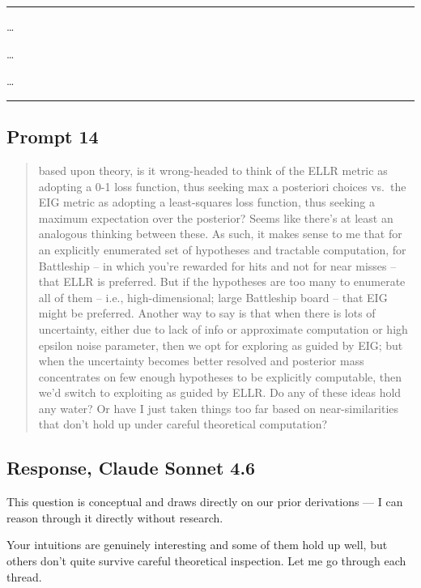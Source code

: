 \documentclass[
]{article}
\begin{document}
\begin{center}\rule{0.5\linewidth}{0.5pt}\end{center}

\ldots{}

\ldots{}

\ldots{}

\begin{center}\rule{0.5\linewidth}{0.5pt}\end{center}

\subsection{Prompt 14}\label{prompt-14}

\begin{quote}
based upon theory, is it wrong-headed to think of the ELLR metric as
adopting a 0-1 loss function, thus seeking max a posteriori choices
vs.~the EIG metric as adopting a least-squares loss function, thus
seeking a maximum expectation over the posterior? Seems like there's at
least an analogous thinking between these. As such, it makes sense to me
that for an explicitly enumerated set of hypotheses and tractable
computation, for Battleship -- in which you're rewarded for hits and not
for near misses -- that ELLR is preferred. But if the hypotheses are too
many to enumerate all of them -- i.e., high-dimensional; large
Battleship board -- that EIG might be preferred. Another way to say is
that when there is lots of uncertainty, either due to lack of info or
approximate computation or high epsilon noise parameter, then we opt for
exploring as guided by EIG; but when the uncertainty becomes better
resolved and posterior mass concentrates on few enough hypotheses to be
explicitly computable, then we'd switch to exploiting as guided by ELLR.
Do any of these ideas hold any water? Or have I just taken things too
far based on near-similarities that don't hold up under careful
theoretical computation?
\end{quote}

\subsection{Response, Claude Sonnet
4.6}\label{response-claude-sonnet-4.6-4}

This question is conceptual and draws directly on our prior derivations
--- I can reason through it directly without research.

Your intuitions are genuinely interesting and some of them hold up well,
but others don't quite survive careful theoretical inspection. Let me go
through each thread.
\end{document}
